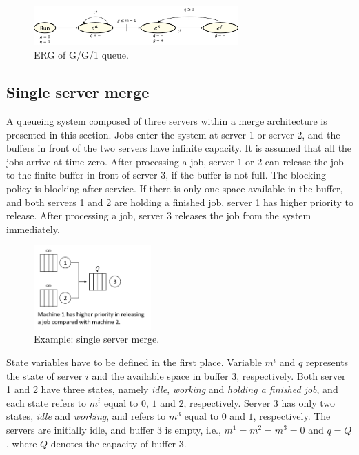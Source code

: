\documentclass[]{interact}
\theoremstyle{plain}%
\theoremstyle{definition}
\theoremstyle{remark}
\begin{document}
\begin{figure}[h]
	\centering
	\includegraphics[width=0.7\textwidth]{Figures/ERG_GG1.png}
	\caption{ERG of G/G/1 queue.}
	\label{fig:ERG_GG1}
\end{figure}

\subsection{Single server merge}

A queueing system composed of three servers within a merge architecture is presented in this section. Jobs enter the system at server 1 or server 2, and the buffers in front of the two servers have infinite capacity. It is assumed that all the jobs arrive at time zero. After processing a job, server 1 or 2 can release the job to the finite buffer in front of server 3, if the buffer is not full. The blocking policy is blocking-after-service. If there is only one space available in the buffer, and both servers 1 and 2 are holding a finished job, server 1 has higher priority to release. After processing a job, server 3 releases the job from the system immediately. 

\begin{figure}[h]
	\centering
	\includegraphics[width=0.4\textwidth]{Figures/merge.png}
	\caption{Example: single server merge.}
\end{figure}

State variables have to be defined in the first place. Variable $m^i$ and $q$ represents the state of server $i$ and the available space in buffer 3, respectively. Both server 1 and 2 have three states, namely \textit{idle}, \textit{working} and \textit{holding a finished job}, and each state refers to $m^i$ equal to $0$, $1$ and $2$, respectively. Server 3 has only two states, \textit{idle} and \textit{working}, and refers to $m^3$ equal to $0$ and $1$, respectively. The servers are initially idle, and buffer 3 is empty, i.e., $m^1=m^2=m^3=0$ and $q=Q$, where $Q$ denotes the capacity of buffer 3.
\end{document}
